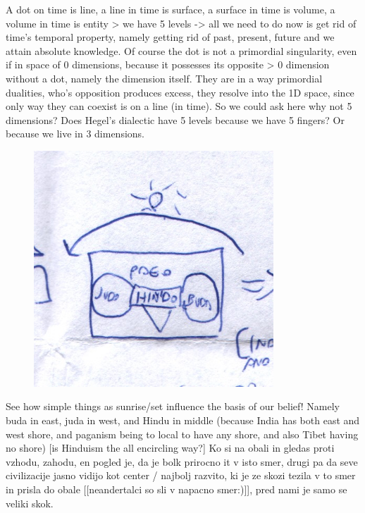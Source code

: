 \documentclass[10pt]{book}
\begin{document}
A dot on time is line, a line in time is surface, a surface in time is volume, a volume in time is entity > we have 5 levels -> all we need to do now is get rid of time's temporal property, namely getting rid of past, present, future and we attain absolute knowledge.
Of course the dot is not a primordial singularity, even if in space of 0 dimensions, because it possesses its opposite > 0 dimension without a dot, namely the dimension itself. They are in a way primordial dualities, who's opposition produces excess, they resolve into the 1D space, since only way they can coexist is on a line (in time).
So we could ask here why not 5 dimensions? Does Hegel's dialectic have 5 levels because we have 5 fingers? Or because we live in 3 dimensions.
\begin{figure}[ht!]
\centering
\includegraphics[width=90mm]{scan01.jpg}
\label{overflow}
\end{figure}
See how simple things as sunrise/set influence the basis of our belief! Namely buda in east, juda in west, and Hindu in middle (because India has both east and west shore, and paganism being to local to have any shore, and also Tibet having no shore) [is Hinduism the all encircling way?] Ko si na obali in gledas proti vzhodu, zahodu, en pogled je, da je bolk prirocno it v isto smer, drugi pa da seve civilizacije jasno vidijo kot center / najbolj razvito, ki je ze skozi tezila v to smer in prisla do obale [[neandertalci so sli v napacno smer:)]], pred nami je samo se veliki skok.
\end{document}

